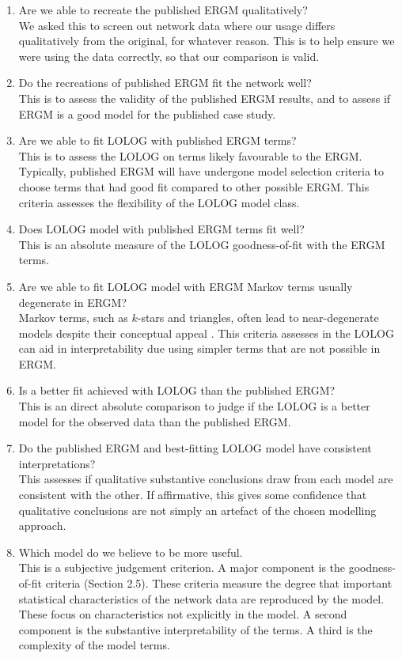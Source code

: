 \documentclass[
]{statsoc}
\begin{document}
\begin{enumerate}
\item Are we able to recreate the published ERGM qualitatively?\\
We asked this to screen out network data where our usage differs qualitatively from the original, for whatever reason. This is to help ensure we were using the data correctly, so that our comparison is valid.
\item Do the recreations of published ERGM fit the network well?\\
This is to assess the validity of the published ERGM results, and to assess if ERGM is a good model for the published case study.
\item Are we able to fit LOLOG with published ERGM terms?\\
This is to assess the LOLOG on terms likely favourable to the ERGM. Typically, published ERGM will have undergone model selection criteria to
choose terms that had good fit compared to other possible ERGM. This criteria assesses the flexibility of the LOLOG model class.
\item Does LOLOG model with published ERGM terms fit well?\\
This is an absolute measure of the LOLOG goodness-of-fit with the ERGM terms.
\item Are we able to fit LOLOG model with ERGM Markov terms usually degenerate in ERGM?\\
Markov terms, such as $k$-stars and triangles, often lead to near-degenerate models despite their conceptual appeal \citep{FrankStrauss1986}. This criteria assesses in the LOLOG can aid in interpretability due using simpler terms that are not possible in ERGM.
\item Is a better fit achieved with LOLOG than the published ERGM?\\
This is an direct absolute comparison to judge if the LOLOG is a better model for the observed data than the published ERGM.
\item Do the published ERGM and best-fitting LOLOG model have consistent interpretations?\\
This assesses if qualitative substantive conclusions draw from each model are consistent with the other.
If affirmative, this gives some confidence that qualitative conclusions are not simply an artefact of the chosen modelling approach.
\item Which model do we believe to be more useful.\\
This is a subjective judgement criterion. A major component is the goodness-of-fit criteria (Section 2.5). These criteria measure the degree that important statistical characteristics of the network data are reproduced by the model. These focus on characteristics not explicitly in the model. A second component is the substantive interpretability of the terms. A third is the complexity of the model terms.
\end{enumerate}
\end{document}
